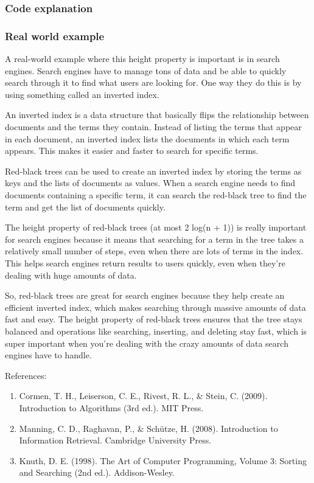 \documentclass[10pt]{article}
\begin{document}
  \subsubsection*{Code explanation}


  \subsubsection*{Real world example}


  A real-world example where this height property is important is in search engines.
  Search engines have to manage tons of data and be able to quickly search
  through it to find what users are looking for. One way they do this is by using
  something called an inverted index.

  \spacing
  \noindent
  An inverted index is a data structure that basically flips the relationship between
  documents and the terms they contain. Instead of listing the terms that appear
  in each document, an inverted index lists the documents in which each term appears.
  This makes it easier and faster to search for specific terms.

  \spacing
  \noindent
  Red-black trees can be used to create an inverted index by storing the terms
  as keys and the lists of documents as values. When a search engine needs to find
  documents containing a specific term, it can search the red-black tree to find
  the term and get the list of documents quickly.

  \spacing
  \noindent
  The height property of red-black trees (at most 2 log(n + 1)) is really important
  for search engines because it means that searching for a term in the tree takes
  a relatively small number of steps, even when there are lots of terms in the
  index. This helps search engines return results to users quickly, even when
  they're dealing with huge amounts of data.

  \spacing
  \noindent
  So, red-black trees are great for search engines because they help create an efficient
  inverted index, which makes searching through massive amounts of data fast and
  easy. The height property of red-black trees ensures that the tree stays balanced
  and operations like searching, inserting, and deleting stay fast, which is
  super important when you're dealing with the crazy amounts of data search
  engines have to handle.

  \spacing
  \noindent
  References:

  \begin{enumerate}
    \item Cormen, T. H., Leiserson, C. E., Rivest, R. L., & Stein, C. (2009).
      Introduction to Algorithms (3rd ed.). MIT Press.

    \item Manning, C. D., Raghavan, P., & Schütze, H. (2008). Introduction to Information
      Retrieval. Cambridge University Press.

    \item Knuth, D. E. (1998). The Art of Computer Programming, Volume 3: Sorting
      and Searching (2nd ed.). Addison-Wesley.
  \end{enumerate}
\end{document}
